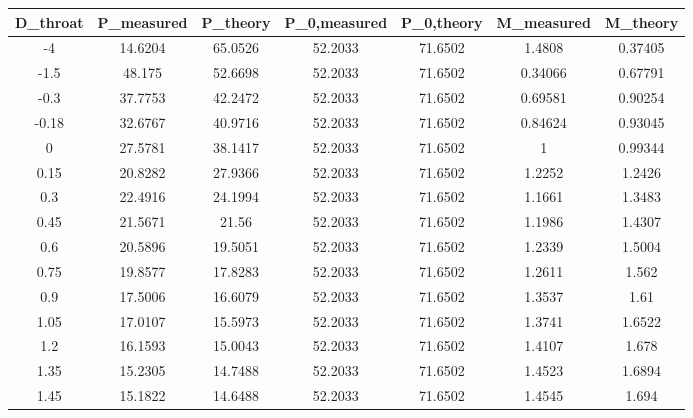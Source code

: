 \begin{tabular}{ccccccc}
\toprule
D_{throat} & P_{measured} & P_{theory} & P_{0,measured} & P_{0,theory} & M_{measured} & M_{theory} \\
\midrule
-4 & 14.6204 & 65.0526 & 52.2033 & 71.6502 & 1.4808 & 0.37405 \\ 
-1.5 & 48.175 & 52.6698 & 52.2033 & 71.6502 & 0.34066 & 0.67791 \\ 
-0.3 & 37.7753 & 42.2472 & 52.2033 & 71.6502 & 0.69581 & 0.90254 \\ 
-0.18 & 32.6767 & 40.9716 & 52.2033 & 71.6502 & 0.84624 & 0.93045 \\ 
0 & 27.5781 & 38.1417 & 52.2033 & 71.6502 & 1 & 0.99344 \\ 
0.15 & 20.8282 & 27.9366 & 52.2033 & 71.6502 & 1.2252 & 1.2426 \\ 
0.3 & 22.4916 & 24.1994 & 52.2033 & 71.6502 & 1.1661 & 1.3483 \\ 
0.45 & 21.5671 & 21.56 & 52.2033 & 71.6502 & 1.1986 & 1.4307 \\ 
0.6 & 20.5896 & 19.5051 & 52.2033 & 71.6502 & 1.2339 & 1.5004 \\ 
0.75 & 19.8577 & 17.8283 & 52.2033 & 71.6502 & 1.2611 & 1.562 \\ 
0.9 & 17.5006 & 16.6079 & 52.2033 & 71.6502 & 1.3537 & 1.61 \\ 
1.05 & 17.0107 & 15.5973 & 52.2033 & 71.6502 & 1.3741 & 1.6522 \\ 
1.2 & 16.1593 & 15.0043 & 52.2033 & 71.6502 & 1.4107 & 1.678 \\ 
1.35 & 15.2305 & 14.7488 & 52.2033 & 71.6502 & 1.4523 & 1.6894 \\ 
1.45 & 15.1822 & 14.6488 & 52.2033 & 71.6502 & 1.4545 & 1.694 \\ 
\bottomrule
\end{tabular}